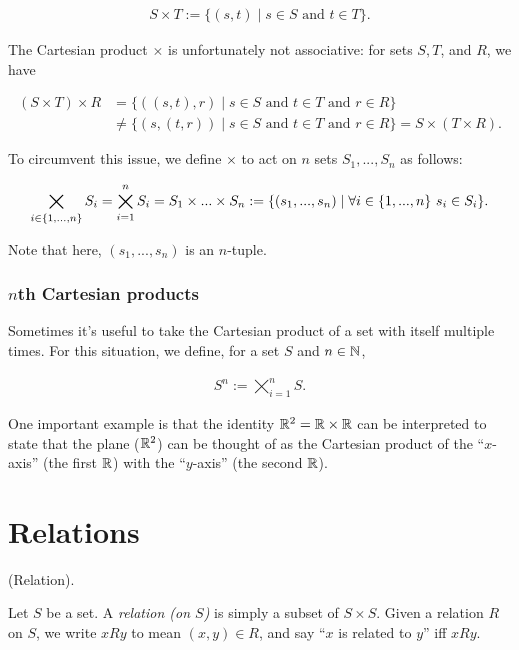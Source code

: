 \begin{align*}
    S \times T := \{(s, t) \mid s \in S \text{ and } t \in T\}.
\end{align*}

The Cartesian product $\times$ is unfortunately not associative: for sets $S, T$, and $R$, we have

\begin{align*}
    (S \times T) \times R &= \{ ((s, t), r) \mid s \in S \text{ and } t \in T \text{ and } r \in R\} \\ &\neq \{(s, (t, r)) \mid s \in S \text{ and } t \in T \text{ and } r \in R\} = S \times (T \times R).
\end{align*}

To circumvent this issue, we define $\times$ to act on $n$ sets $S_1, ..., S_n$ as follows:

\begin{align*}
    \bigtimes_{i \in \{1, ..., n\}} S_i = \bigtimes_{i = 1}^n S_i = S_1 \times ... \times S_n := \{(s_1, ..., s_n) \mid \forall i \in \{1, ..., n\} \text{ } s_i \in S_i\}.
\end{align*}

Note that here, $(s_1, ..., s_n)$ is an $n$-tuple.

\subsubsection*{$n$th Cartesian products}

Sometimes it's useful to take the Cartesian product of a set with itself multiple times. For this situation, we define, for a set $S$ and $n \in \mathbb{N}$,

\begin{align*}
    S^n := \bigtimes_{i = 1}^n S.
\end{align*}

One important example is that the identity $\mathbb{R}^2 = \mathbb{R} \times \mathbb{R}$ can be interpreted to state that the plane ($\mathbb{R}^2$) can be thought of as the Cartesian product of the ``$x$-axis'' (the first $\mathbb{R}$) with the ``$y$-axis'' (the second $\mathbb{R}$).

\newpage

\section{Relations}

\begin{defn}
    (Relation).

    Let $S$ be a set. A \textit{relation (on $S$)} is simply a subset of $S \times S$. Given a relation $R$ on $S$, we write $xRy$ to mean $(x, y) \in R$, and say ``$x$ is related to $y$'' iff $xRy$.
\end{defn}

